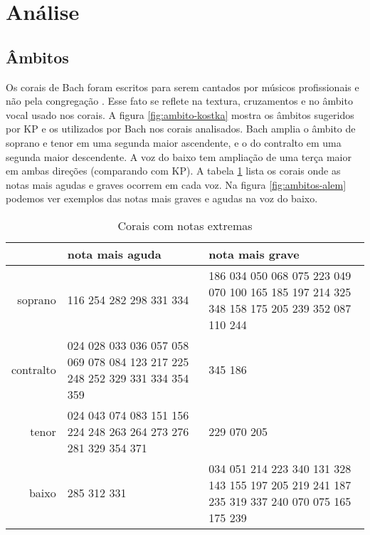 \section{Análise}
\label{sec:analise}

\subsection{Âmbitos}
\label{sec:ambitos}

Os corais de Bach foram escritos para serem cantados por músicos
profissionais e não pela congregação \cite{bach41:371} . Esse fato
se reflete na textura, cruzamentos e no âmbito vocal usado nos corais.
A figura \ref{fig:ambito-kostka} mostra os âmbitos sugeridos por KP e
os utilizados por Bach nos corais analisados. Bach amplia o âmbito de
soprano e tenor em uma segunda maior ascendente, e o do contralto em
uma segunda maior descendente. A voz do baixo tem ampliação de uma
terça maior em ambas direções (comparando com KP). A tabela
\ref{tab:notas-extremas} lista os corais onde as notas mais agudas e
graves ocorrem em cada voz. Na figura \ref{fig:ambitos-alem} podemos
ver exemplos das notas mais graves e agudas na voz do baixo.

\begin{table}
\begin{center}
\begin{small}
\begin{sc}
  \begin{tabular}{r|p{4cm}p{4cm}}
    & nota mais aguda & nota mais grave \\ 
    \hline
    soprano &  116 254 282 298 331 334 &  186 034 050 068 075 223 049 070 100 165 185 197 214 325 348 158 175
    205 239 352 087 110 244 \\ \aroundspace
    contralto & 024 028 033 036 057 058 069 078 084 123 217 225 248 252 329 331 334
    354 359 &   345 186 \\ \aroundspace
    tenor &   024 043 074 083 151 156 224 248 263 264 273 276 281 329
    354 371 &   229 070 205 \\ \aroundspace
    baixo &   285 312 331 &   034 051 214 223 340 131 328 143 155 197 205 219 241 187 235 319 337
    240 070 075 165 175 239 
  \end{tabular}
  \caption{Corais com notas extremas}
  \label{tab:notas-extremas}
\end{sc}
\end{small}
\end{center}
\end{table}


